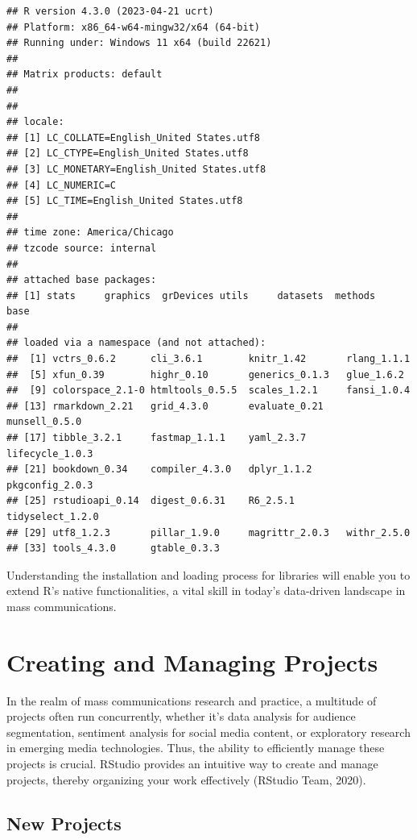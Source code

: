\documentclass[
  b5paper]{book}
\begin{document}
\begin{verbatim}
## R version 4.3.0 (2023-04-21 ucrt)
## Platform: x86_64-w64-mingw32/x64 (64-bit)
## Running under: Windows 11 x64 (build 22621)
## 
## Matrix products: default
## 
## 
## locale:
## [1] LC_COLLATE=English_United States.utf8 
## [2] LC_CTYPE=English_United States.utf8   
## [3] LC_MONETARY=English_United States.utf8
## [4] LC_NUMERIC=C                          
## [5] LC_TIME=English_United States.utf8    
## 
## time zone: America/Chicago
## tzcode source: internal
## 
## attached base packages:
## [1] stats     graphics  grDevices utils     datasets  methods   base     
## 
## loaded via a namespace (and not attached):
##  [1] vctrs_0.6.2      cli_3.6.1        knitr_1.42       rlang_1.1.1     
##  [5] xfun_0.39        highr_0.10       generics_0.1.3   glue_1.6.2      
##  [9] colorspace_2.1-0 htmltools_0.5.5  scales_1.2.1     fansi_1.0.4     
## [13] rmarkdown_2.21   grid_4.3.0       evaluate_0.21    munsell_0.5.0   
## [17] tibble_3.2.1     fastmap_1.1.1    yaml_2.3.7       lifecycle_1.0.3 
## [21] bookdown_0.34    compiler_4.3.0   dplyr_1.1.2      pkgconfig_2.0.3 
## [25] rstudioapi_0.14  digest_0.6.31    R6_2.5.1         tidyselect_1.2.0
## [29] utf8_1.2.3       pillar_1.9.0     magrittr_2.0.3   withr_2.5.0     
## [33] tools_4.3.0      gtable_0.3.3
\end{verbatim}

Understanding the installation and loading process for libraries will enable you to extend R's native functionalities, a vital skill in today's data-driven landscape in mass communications.

\hypertarget{creating-and-managing-projects}{%
\section{Creating and Managing Projects}\label{creating-and-managing-projects}}

In the realm of mass communications research and practice, a multitude of projects often run concurrently, whether it's data analysis for audience segmentation, sentiment analysis for social media content, or exploratory research in emerging media technologies. Thus, the ability to efficiently manage these projects is crucial. RStudio provides an intuitive way to create and manage projects, thereby organizing your work effectively (RStudio Team, 2020).

\hypertarget{new-projects}{%
\subsection*{New Projects}\label{new-projects}}
\end{document}
